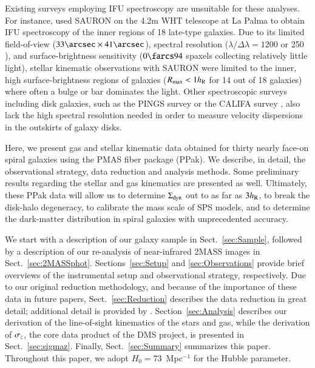 \documentclass[traditabstract]{aa} %
\begin{document}
Existing surveys employing IFU spectroscopy are unsuitable for these analyses.
For instance, \citet{ganda2006} used SAURON on the 4.2m WHT telescope at La Palma
to obtain IFU spectroscopy of the inner regions of 18 late-type galaxies.  Due
to its limited field-of-view ($33\arcsec \times 41\arcsec$), spectral resolution
($\lambda/\Delta\lambda=1200$ or 250 \kms), and surface-brightness sensitivity
($0\farcs94$ spaxels collecting relatively little light), stellar kinematic
observations with SAURON were limited to the inner, high surface-brightness
regions of galaxies ($R_{\rm max}<1h_{\rm R}$ for 14 out of 18 galaxies) where often a
bulge or bar dominates the light.  Other spectroscopic surveys including disk
galaxies, such as the PINGS survey \citep{rosales-ortega2010} or the CALIFA
survey \citep{sanchez2012}, also lack the high spectral resolution needed in
order to measure velocity dispersions in the outskirts of galaxy disks.

Here, we present gas and stellar kinematic data obtained for thirty nearly face-on
spiral galaxies using the PMAS fiber package (PPak).  We describe, in detail, the
observational strategy, data reduction and analysis methods.  Some preliminary
results regarding the stellar and gas kinematics are presented as well.
Ultimately, these PPak data will allow us to determine $\Sigma_{\rm dyn}$ out to as far as
$3h_{\rm R}$, to break the disk-halo degeneracy, to calibrate the mass scale of SPS models,
and to determine the dark-matter distribution in spiral galaxies with unprecedented
accuracy.

We start with a description of our galaxy sample in Sect.~\ref{sec:Sample},
followed by a description of our re-analysis of near-infrared 2MASS images in
Sect.~\ref{sec:2MASSphot}.  Sections~\ref{sec:Setup} and \ref{sec:Observations}
provide brief overviews of the instrumental setup and observational strategy,
respectively.  Due to our original reduction methodology, and because of the
importance of these data in future papers, Sect.~\ref{sec:Reduction} describes
the data reduction in great detail; additional detail is provided by
\citet{martinsson2011}.
Section~\ref{sec:Analysis} describes our derivation of the line-of-sight
kinematics of the stars and gas, while the derivation of $\sigma_z$, the core data
product of the DMS project, is presented in Sect.~\ref{sec:sigmaz}.
Finally, Sect.~\ref{sec:Summary} summarizes this paper.  Throughout this
paper, we adopt $H_0=73$\kms~Mpc$^{-1}$ for the Hubble parameter.
\end{document}
